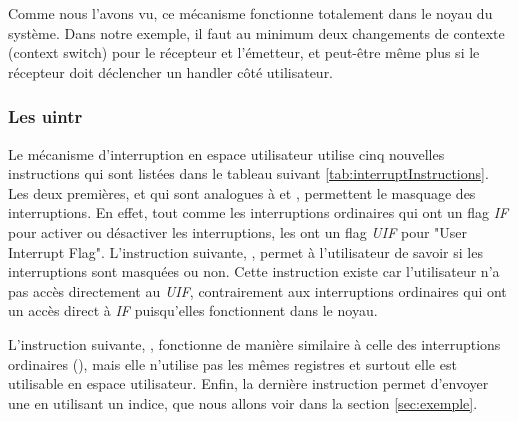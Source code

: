 Comme nous l'avons vu, ce mécanisme fonctionne totalement dans le noyau du système.
Dans notre exemple, il faut au minimum deux changements de contexte (context switch) pour le récepteur et l'émetteur,
et peut-être même plus si le récepteur doit déclencher un handler côté utilisateur.


\subsubsection{Les uintr}
\label{sec:uintrDetails}

Le mécanisme d'interruption en espace utilisateur utilise cinq nouvelles instructions qui sont listées dans le tableau suivant \ref{tab:interruptInstructions}.
Les deux premières,  et  qui sont analogues à  et ,
permettent le masquage des interruptions.
En effet, tout comme les interruptions ordinaires qui ont un flag \emph{IF} pour activer ou désactiver les interruptions,
les \uintr{} ont un flag \emph{UIF} pour "User Interrupt Flag".
L'instruction suivante, , permet à l'utilisateur de savoir si les interruptions sont masquées ou non.
Cette instruction existe car l'utilisateur n'a pas accès directement au \emph{UIF},
contrairement aux interruptions ordinaires qui ont un accès direct à \emph{IF} puisqu'elles fonctionnent dans le noyau.

L'instruction suivante, , fonctionne de manière similaire à celle des interruptions ordinaires (),
mais elle n'utilise pas les mêmes registres et surtout elle est utilisable en espace utilisateur.
Enfin, la dernière instruction permet d'envoyer une \uintr{} en utilisant un indice, que nous allons voir dans la section \ref{sec:exemple}.

